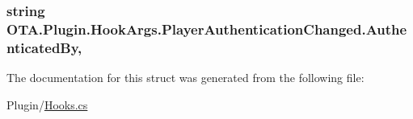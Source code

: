 \subsubsection[{Authenticated\+By}]{\setlength{\rightskip}{0pt plus 5cm}string O\+T\+A.\+Plugin.\+Hook\+Args.\+Player\+Authentication\+Changed.\+Authenticated\+By\hspace{0.3cm}{\ttfamily [get]}, {\ttfamily [set]}}\label{struct_o_t_a_1_1_plugin_1_1_hook_args_1_1_player_authentication_changed_aeb77429a87bc5534d08e1b1d8a63d50d}


The documentation for this struct was generated from the following file\+:\begin{DoxyCompactItemize}
\item 
Plugin/\hyperlink{_hooks_8cs}{Hooks.\+cs}\end{DoxyCompactItemize}
